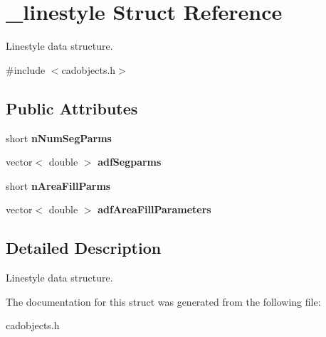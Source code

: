 \hypertarget{struct__linestyle}{}\section{\+\_\+linestyle Struct Reference}
\label{struct__linestyle}


Linestyle data structure.  




{\ttfamily \#include $<$cadobjects.\+h$>$}

\subsection*{Public Attributes}
\begin{DoxyCompactItemize}
\item 
short {\bfseries n\+Num\+Seg\+Parms}\hypertarget{struct__linestyle_a70dc74c97350afc320135192e3825bcb}{}\label{struct__linestyle_a70dc74c97350afc320135192e3825bcb}

\item 
vector$<$ double $>$ {\bfseries adf\+Segparms}\hypertarget{struct__linestyle_a8466a6eaca9e276affbf3df0b703b125}{}\label{struct__linestyle_a8466a6eaca9e276affbf3df0b703b125}

\item 
short {\bfseries n\+Area\+Fill\+Parms}\hypertarget{struct__linestyle_af2f18b0f6312abf3d24d2fc734ad109d}{}\label{struct__linestyle_af2f18b0f6312abf3d24d2fc734ad109d}

\item 
vector$<$ double $>$ {\bfseries adf\+Area\+Fill\+Parameters}\hypertarget{struct__linestyle_a1ca7061d9bc90887adc7179e6d6dd210}{}\label{struct__linestyle_a1ca7061d9bc90887adc7179e6d6dd210}

\end{DoxyCompactItemize}


\subsection{Detailed Description}
Linestyle data structure. 

The documentation for this struct was generated from the following file\+:\begin{DoxyCompactItemize}
\item 
cadobjects.\+h\end{DoxyCompactItemize}

